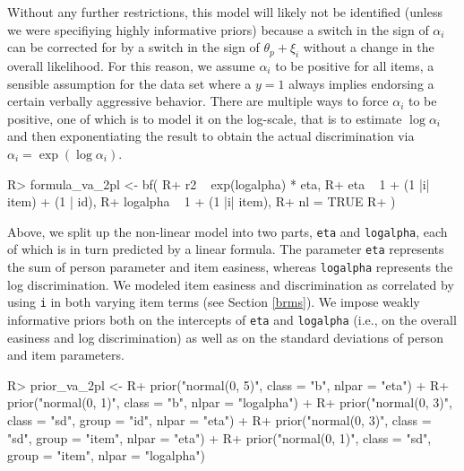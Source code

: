 \documentclass[jss]{jss}
\begin{document}
Without any further restrictions, this model will likely not be
identified (unless we were specifiying highly informative priors)
because a switch in the sign of \(\alpha_i\) can be corrected for by a
switch in the sign of \(\theta_p + \xi_i\) without a change in the
overall likelihood. For this reason, we assume \(\alpha_i\) to be
positive for all items, a sensible assumption for the 
data set where a \(y = 1\) always implies endorsing a certain verbally
aggressive behavior. There are multiple ways to force \(\alpha_i\) to be
positive, one of which is to model it on the log-scale, that is to
estimate \(\log \alpha_i\) and then exponentiating the result to obtain
the actual discrimination via \(\alpha_i = \exp(\log \alpha_i)\).

\begin{CodeChunk}

\begin{CodeInput}
R> formula_va_2pl <- bf(
R+   r2 ~ exp(logalpha) * eta,
R+   eta ~ 1 + (1 |i| item) + (1 | id),
R+   logalpha ~ 1 + (1 |i| item),
R+   nl = TRUE
R+ )
\end{CodeInput}
\end{CodeChunk}

Above, we split up the non-linear model into two parts, \texttt{eta} and
\texttt{logalpha}, each of which is in turn predicted by a linear
formula. The parameter \texttt{eta} represents the sum of person
parameter and item easiness, whereas \texttt{logalpha} represents the
log discrimination. We modeled item easiness and discrimination as
correlated by using \texttt{\textbar{}i\textbar{}} in both varying item
terms (see Section \ref{brms}). We impose weakly informative priors both
on the intercepts of \texttt{eta} and \texttt{logalpha} (i.e., on the
overall easiness and log discrimination) as well as on the standard
deviations of person and item parameters.

\begin{CodeChunk}

\begin{CodeInput}
R> prior_va_2pl <- 
R+   prior("normal(0, 5)", class = "b", nlpar = "eta") +
R+   prior("normal(0, 1)", class = "b", nlpar = "logalpha") +
R+   prior("normal(0, 3)", class = "sd", group = "id", nlpar = "eta") + 
R+   prior("normal(0, 3)", class = "sd", group = "item", nlpar = "eta") +
R+   prior("normal(0, 1)", class = "sd", group = "item", nlpar = "logalpha")
\end{CodeInput}
\end{CodeChunk}
\end{document}
